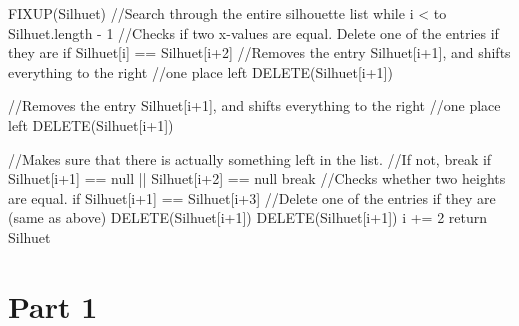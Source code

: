 \documentclass[a4paper,oneside,article,11pt]{memoir}
\begin{document}
\begin{VerbatimTest}
FIXUP(Silhuet)
    //Search through the entire silhouette list
    while i < to Silhuet.length - 1 
        //Checks if two x-values are equal. Delete one of the entries if they are
        if Silhuet[i] == Silhuet[i+2]
            //Removes the entry Silhuet[i+1], and shifts everything to the right
            //one place left
            DELETE(Silhuet[i+1])
            
            //Removes the entry Silhuet[i+1], and shifts everything to the right
            //one place left
            DELETE(Silhuet[i+1])
            
        //Makes sure that there is actually something left in the list.
        //If not, break
        if Silhuet[i+1] == null || Silhuet[i+2] == null
            break
        //Checks whether two heights are equal.
        if Silhuet[i+1] == Silhuet[i+3] 
            //Delete one of the entries if they are (same as above)
            DELETE(Silhuet[i+1])        
            DELETE(Silhuet[i+1])
        i += 2
    return Silhuet
\end{VerbatimTest}

\chapter*{Part 1}
\end{document}
